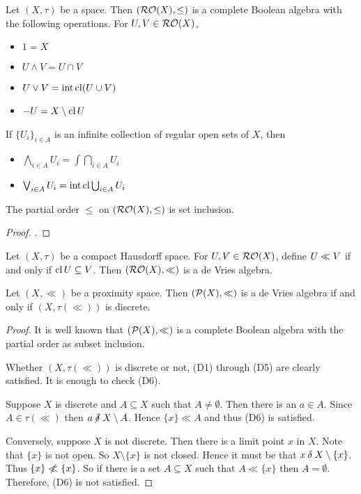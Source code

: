 \begin{theorem}%
	Let \( (X, \tau) \) be a space.  Then \( (\operatorname{\mathcal{RO}}(X),\leq) \) is a complete Boolean algebra with the following operations.  For \( U,V \in \operatorname{\mathcal{RO}}(X) \),
	\begin{itemize}
		\item \( 1 = X \)
		\item \( U \wedge V = U \cap V \)
		\item \( U \vee V = \operatorname{int}\operatorname{cl}(U \cup V) \)
		\item \( -U = X \setminus \operatorname{cl}{U} \)
	\end{itemize}
	If \( \{U_i\}_{i \in A} \) is an infinite collection of regular open sets of \( X \), then
	\begin{itemize}
		\item \( \bigwedge_{i \in A} U_i = \int{\bigcap_{i \in A} U_i} \)
		\item \( \bigvee_{i \in A} U_i = \operatorname{int}\operatorname{cl}{\bigcup_{i \in A} U_i} \)
	\end{itemize}
	The partial order \( \leq \) on \( (\operatorname{\mathcal{RO}}(X),\leq) \) is set inclusion.
\end{theorem}
\begin{proof}
	\cite[7.21 \& 7.22]{polkowski}.
\end{proof}

\begin{example}
	\label{devexro}
	Let \( (X,\tau) \) be a compact Hausdorff space.  For \( U,V \in \operatorname{\mathcal{RO}}(X) \), define \( U \ll V \) if and only if \( \operatorname{cl}{U} \subseteq V \).  Then \( (\operatorname{\mathcal{RO}}(X),\mathord{\ll}) \) is a de Vries algebra.
\end{example}

\begin{example}
	\label{PXdev}
	Let \( (X,\ll) \) be a proximity space.  Then \( (\mathcal{P}(X),\ll) \) is a de Vries algebra if and only if \( (X,\tau(\ll)) \) is discrete.
\end{example}
\begin{proof}
	It is well known that \( (\mathcal{P}(X),\ll) \) is a complete Boolean algebra with the partial order as subset inclusion.

	Whether \( (X,\tau(\ll)) \) is discrete or not, (D1) through (D5) are clearly satisfied.  It is enough to check (D6).

	Suppose \( X \) is discrete and \( A \subseteq X \) such that \( A \neq \emptyset \).  Then there is an \( a \in A \).  Since \( A \in \tau(\ll) \) then \( a \nnear X \setminus A \).  Hence \( \{ x \} \ll A \) and thus (D6) is satisfied.
	
	Conversely, suppose \( X \) is not discrete.  Then there is a limit point \( x \) in \( X \).  Note that \( \{x\} \) is not open.  So \( X \setminus \{x\} \) is not closed.  Hence it must be that \( x \mathbin{\delta} X \setminus \{x\} \).  Thus \( \{x\} \nll \{x\} \).  So if there is a set \( A \subseteq X \) such that \( A \ll \{x\} \) then \( A = \emptyset \).  Therefore, (D6) is not satisfied.
\end{proof}

